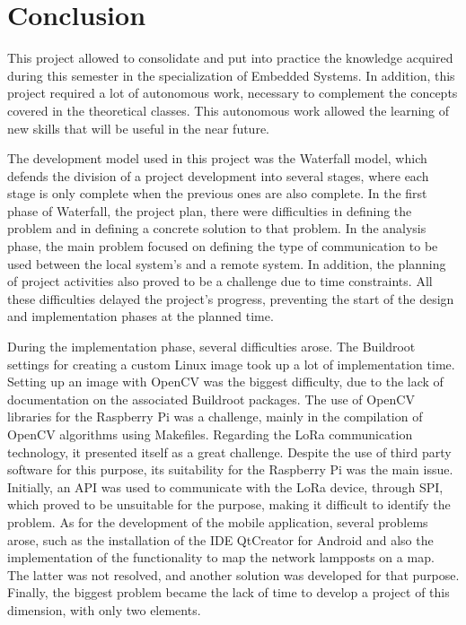 \section{Conclusion}

This project allowed to consolidate and put into practice the knowledge acquired during this semester in the specialization of Embedded Systems. In addition, this project required a lot of autonomous work, necessary to complement the concepts covered in the theoretical classes. This autonomous work allowed the learning of new skills that will be useful in the near future.

The development model used in this project was the Waterfall model, which defends the division of a project development into several stages, where each stage is only complete when the previous ones are also complete. In the first phase of Waterfall, the project plan, there were difficulties in defining the problem and in defining a concrete solution to that problem. In the analysis phase, the main problem focused on defining the type of communication to be used between the local system’s and a remote system. In addition, the planning of project activities also proved to be a challenge due to time constraints. All these difficulties delayed the project's progress, preventing the start of the design and implementation phases at the planned time.

During the implementation phase, several difficulties arose. The Buildroot settings for creating a custom Linux image took up a lot of implementation time. Setting up an image with OpenCV was the biggest difficulty, due to the lack of documentation on the associated Buildroot packages. The use of OpenCV libraries for the Raspberry Pi was a challenge, mainly in the compilation of OpenCV algorithms using Makefiles. Regarding the LoRa communication technology, it presented itself as a great challenge. Despite the use of third party software for this purpose, its suitability for the Raspberry Pi was the main issue. Initially, an API was used to communicate with the LoRa device, through SPI, which proved to be unsuitable for the purpose, making it difficult to identify the problem. As for the development of the mobile application, several problems arose, such as the installation of the IDE QtCreator for Android and also the implementation of the functionality to map the network lampposts on a map. The latter was not resolved, and another solution was developed for that purpose. Finally, the biggest problem became the lack of time to develop a project of this dimension, with only two elements.

